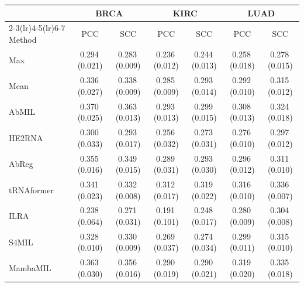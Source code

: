 \begin{tabular}{lcccccc}
\toprule
& \multicolumn{2}{c}{BRCA} & \multicolumn{2}{c}{KIRC} & \multicolumn{2}{c}{LUAD}\\
\cmidrule(lr){2-3}\cmidrule(lr){4-5}\cmidrule(lr){6-7}
Method & PCC & SCC & PCC & SCC & PCC & SCC\\
\midrule
Max~\citep{wang2018revisiting} & 0.294\,{\tiny(0.021)} & 0.283\,{\tiny(0.009)} & 0.236\,{\tiny(0.012)} & 0.244\,{\tiny(0.013)} & 0.258\,{\tiny(0.018)} & 0.278\,{\tiny(0.015)}\\
Mean~\citep{wang2018revisiting} & 0.336\,{\tiny(0.027)} & 0.338\,{\tiny(0.009)} & 0.285\,{\tiny(0.009)} & 0.293\,{\tiny(0.014)} & 0.292\,{\tiny(0.010)} & 0.315\,{\tiny(0.012)}\\
AbMIL~\citep{ilse2018abmil} & 0.370\,{\tiny(0.025)} & 0.363\,{\tiny(0.013)} & 0.293\,{\tiny(0.013)} & 0.299\,{\tiny(0.015)} & 0.308\,{\tiny(0.013)} & 0.324\,{\tiny(0.018)}\\
HE2RNA~\citep{schmauch2020he2rna} & 0.300\,{\tiny(0.033)} & 0.293\,{\tiny(0.017)} & 0.256\,{\tiny(0.032)} & 0.273\,{\tiny(0.031)} & 0.276\,{\tiny(0.010)} & 0.297\,{\tiny(0.012)}\\
AbReg~\citep{graziani2022abreg} & 0.355\,{\tiny(0.016)} & 0.349\,{\tiny(0.015)} & 0.289\,{\tiny(0.031)} & 0.293\,{\tiny(0.030)} & 0.296\,{\tiny(0.012)} & 0.311\,{\tiny(0.010)}\\
tRNAformer~\citep{alsaafin2022trnaformer} & 0.341\,{\tiny(0.023)} & 0.332\,{\tiny(0.008)} & 0.312\,{\tiny(0.017)} & 0.319\,{\tiny(0.022)} & 0.316\,{\tiny(0.010)} & 0.336\,{\tiny(0.007)}\\
ILRA~\citep{xiang2023ilra} & 0.238\,{\tiny(0.064)} & 0.271\,{\tiny(0.031)} & 0.191\,{\tiny(0.101)} & 0.248\,{\tiny(0.017)} & 0.280\,{\tiny(0.009)} & 0.304\,{\tiny(0.008)}\\
S4MIL~\citep{fillioux2023s4mil} & 0.328\,{\tiny(0.010)} & 0.330\,{\tiny(0.009)} & 0.269\,{\tiny(0.037)} & 0.274\,{\tiny(0.034)} & 0.299\,{\tiny(0.011)} & 0.315\,{\tiny(0.010)}\\
MambaMIL~\citep{yang2024mambamil} & 0.363\,{\tiny(0.030)} & 0.356\,{\tiny(0.016)} & 0.290\,{\tiny(0.019)} & 0.290\,{\tiny(0.021)} & 0.319\,{\tiny(0.020)} & 0.335\,{\tiny(0.018)}\\

\end{tabular}
